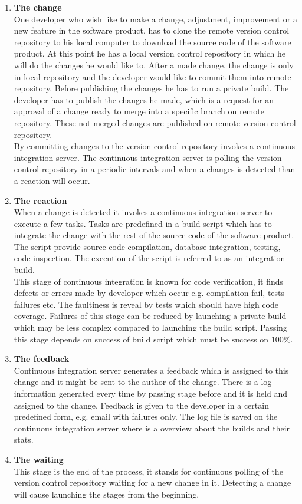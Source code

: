 \begin{enumerate}
	\item \textbf{The change}\\
		  One developer who wish like to make a change, adjustment, improvement or a new feature in the software product, has to clone the remote version control repository to his local computer to download the source code of the software product. At this point he has a local version control repository in which he will do the changes he would like to. After a made change, the change is only in local repository and the developer would like to commit them into remote repository. Before publishing the changes he has to run a private build. The developer has to publish the changes he made, which is a request for an approval of a change ready to merge into a specific branch on remote repository. These not merged changes are published on remote version control repository.\\
		  By committing changes to the version control repository invokes a continuous integration server. The continuous integration server is polling the version control repository in a periodic intervals and when a changes is detected than a reaction will occur.
	\item \textbf{The reaction}\\
		  When a change is detected it invokes a continuous integration server to execute a few tasks. Tasks are predefined in a build script which has to integrate the change with the rest of the source code of the software product. The script provide source code compilation, database integration, testing, code inspection. The execution of the script is referred to as an integration build.\\
		  This stage of continuous integration is known for code verification, it finds defects or errors made by developer which occur e.g. compilation fail, tests failures etc. The faultiness is reveal by tests which should have high code coverage. Failures of this stage can be reduced by launching a private build which may be less complex compared to launching the build script. Passing this stage depends on success of build script which must be success on 100\%.
	\item \textbf{The feedback}\\
		  Continuous integration server generates a feedback which is assigned to this change and it might be sent to the author of the change. There is a log information generated every time by passing stage before and it is held and assigned to the change. Feedback is given to the developer in a certain predefined form, e.g. email with failures only. The log file is saved on the continuous integration server where is a overview about the builds and their stats.
	\item \textbf{The waiting}\\
		  This stage is the end of the process, it stands for continuous polling of  the version control repository waiting for a new change in it. Detecting a change will cause launching the stages from the beginning.
\end{enumerate}



